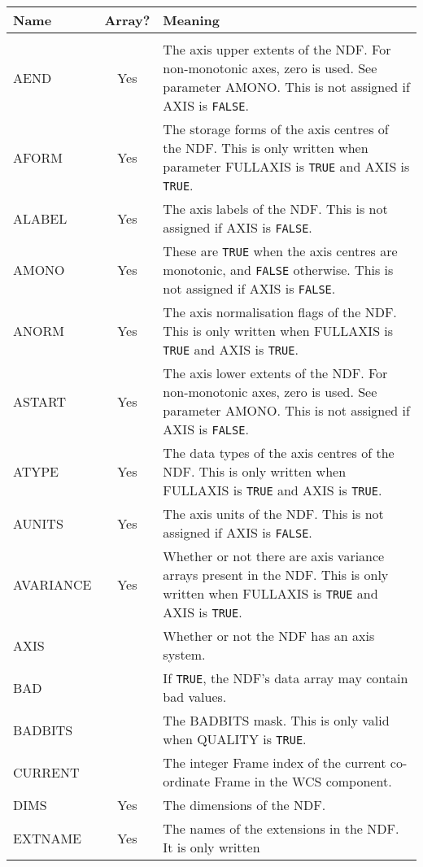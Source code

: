 \newpage
\begin{center}
\begin{tabular}{lcp{112mm}}
Name & Array? & Meaning \\ \hline
\\
AEND & Yes & The axis upper extents of the NDF.  For non-monotonic axes,
             zero is used.  See parameter AMONO.  This is not assigned if
             AXIS is {\tt FALSE}. \\
AFORM & Yes & The storage forms of the axis centres of the NDF.  This is
              only written when parameter FULLAXIS is {\tt TRUE} and AXIS
              is {\tt TRUE}. \\
ALABEL & Yes & The axis labels of the NDF.  This is not assigned if AXIS is
               {\tt FALSE}. \\
AMONO & Yes &  These are {\tt TRUE} when the axis centres are monotonic, and {\tt FALSE}
               otherwise.  This is not assigned if AXIS is {\tt FALSE}. \\
ANORM & Yes &  The axis normalisation flags of the NDF.  This is only written
               when FULLAXIS is {\tt TRUE} and AXIS is {\tt TRUE}. \\
ASTART & Yes &  The axis lower extents of the NDF.  For non-monotonic axes,
                zero is used.  See parameter AMONO.  This is not assigned if
                AXIS is {\tt FALSE}. \\
ATYPE & Yes & The data types of the axis centres of the NDF.  This is only
              written when FULLAXIS is {\tt TRUE} and AXIS is {\tt TRUE}. \\
AUNITS & Yes & The axis units of the NDF.  This is not assigned if AXIS is
               {\tt FALSE}. \\
AVARIANCE & Yes & Whether or not there are axis variance arrays present in the
                  NDF.  This is only written when FULLAXIS is {\tt TRUE} and AXIS is
                  {\tt TRUE}.\\
AXIS & & Whether or not the NDF has an axis system. \\
BAD & & If {\tt TRUE}, the NDF's data array may contain bad values. \\
BADBITS & & The BADBITS mask.  This is only valid when QUALITY is {\tt TRUE}. \\
CURRENT & &  The integer Frame index of the current co-ordinate Frame
             in the WCS component. \\
DIMS & Yes & The dimensions of the NDF. \\
EXTNAME & Yes & The names of the extensions in the NDF.  It is only written

\end{tabular}
\end{center}
